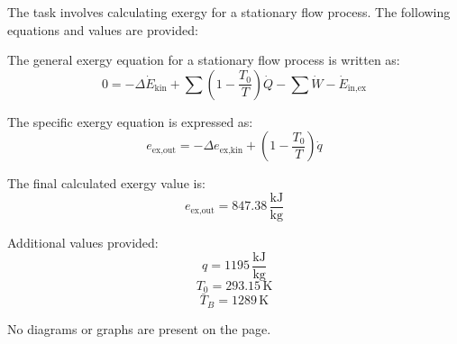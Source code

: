 The task involves calculating exergy for a stationary flow process. The following equations and values are provided:

The general exergy equation for a stationary flow process is written as:  
\[
0 = -\Delta \dot{E}_{\text{kin}} + \sum \left( 1 - \frac{T_0}{T} \right) \dot{Q} - \sum \dot{W} - \dot{E}_{\text{in,ex}}
\]

The specific exergy equation is expressed as:  
\[
e_{\text{ex,out}} = -\Delta e_{\text{ex,kin}} + \left( 1 - \frac{T_0}{T} \right) \dot{q}
\]

The final calculated exergy value is:  
\[
e_{\text{ex,out}} = 847.38 \, \frac{\text{kJ}}{\text{kg}}
\]

Additional values provided:  
\[
q = 1195 \, \frac{\text{kJ}}{\text{kg}}
\]  
\[
T_0 = 293.15 \, \text{K}
\]  
\[
\bar{T}_B = 1289 \, \text{K}
\]  

No diagrams or graphs are present on the page.